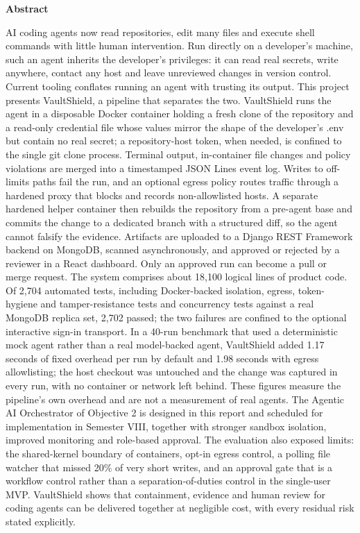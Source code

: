 \documentclass[12pt,a4paper,oneside]{report}
\begin{document}
\thispagestyle{empty}
\vspace*{1.60in}
\begin{center}{\large\bfseries Abstract}\end{center}
\vspace{0.20in}
AI coding agents now read repositories, edit many files and execute shell commands with little human intervention. Run directly on a developer's machine, such an agent inherits the developer's privileges: it can read real secrets, write anywhere, contact any host and leave unreviewed changes in version control. Current tooling conflates running an agent with trusting its output. This project presents VaultShield, a pipeline that separates the two. VaultShield runs the agent in a disposable Docker container holding a fresh clone of the repository and a read-only credential file whose values mirror the shape of the developer's .env but contain no real secret; a repository-host token, when needed, is confined to the single git clone process. Terminal output, in-container file changes and policy violations are merged into a timestamped JSON Lines event log. Writes to off-limits paths fail the run, and an optional egress policy routes traffic through a hardened proxy that blocks and records non-allowlisted hosts. A separate hardened helper container then rebuilds the repository from a pre-agent base and commits the change to a dedicated branch with a structured diff, so the agent cannot falsify the evidence. Artifacts are uploaded to a Django REST Framework backend on MongoDB, scanned asynchronously, and approved or rejected by a reviewer in a React dashboard. Only an approved run can become a pull or merge request. The system comprises about 18,100 logical lines of product code. Of 2,704 automated tests, including Docker-backed isolation, egress, token-hygiene and tamper-resistance tests and concurrency tests against a real MongoDB replica set, 2,702 passed; the two failures are confined to the optional interactive sign-in transport. In a 40-run benchmark that used a deterministic mock agent rather than a real model-backed agent, VaultShield added 1.17 seconds of fixed overhead per run by default and 1.98 seconds with egress allowlisting; the host checkout was untouched and the change was captured in every run, with no container or network left behind. These figures measure the pipeline's own overhead and are not a measurement of real agents. The Agentic AI Orchestrator of Objective 2 is designed in this report and scheduled for implementation in Semester VIII, together with stronger sandbox isolation, improved monitoring and role-based approval. The evaluation also exposed limits: the shared-kernel boundary of containers, opt-in egress control, a polling file watcher that missed 20\% of very short writes, and an approval gate that is a workflow control rather than a separation-of-duties control in the single-user MVP. VaultShield shows that containment, evidence and human review for coding agents can be delivered together at negligible cost, with every residual risk stated explicitly.
\end{document}
